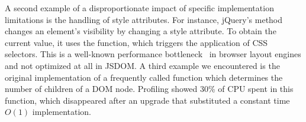 A second example of a disproportionate impact of specific implementation limitations
is the handling of style attributes.  For instance, jQuery's  method changes an element's
visibility by changing a style attribute.  To obtain the current value, it uses the
 function, which triggers the application of CSS selectors.
This is a well-known performance bottleneck~\cite{Meyerovich+:WWW2010} in browser
layout engines and not optimized at all in JSDOM.  A third example we encountered 
is the original implementation of a frequently called function 
which determines the number of children of a DOM node.  Profiling showed 30\% of CPU
spent in this function, which disappeared after an upgrade that substituted a
constant time $O(1)$ implementation.
